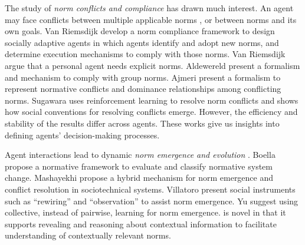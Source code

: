 The study of \emph{norm conflicts and compliance} has drawn much interest.
An agent may face conflicts between multiple applicable norms \citep{Ajmeri-IJCAI16-Coco}, or 
between norms and its own goals. 
Van Riemsdijk {\etal}  develop a norm compliance
framework to design socially adaptive agents in which agents 
identify and adopt new norms, and determine execution mechanisms to comply with those norms. 
Van Riemsdijk {\etal} argue that a personal agent needs explicit norms. 
Aldewereld {\etal}  present a formalism and mechanism to
comply with group norms. Ajmeri {\etal}  present a formalism to represent normative conflicts and dominance relationships among conflicting norms.  
Sugawara  uses
reinforcement learning to resolve norm conflicts and shows how social conventions
for resolving conflicts emerge. However, the efficiency and stability of the results
differ across agents. These works give us insights into defining agents'
decision-making processes.

Agent interactions lead to dynamic \emph{norm emergence and evolution} \citep{Savarimuthu2009NormEmergence}. 
Boella {\etal}  propose a normative framework to evaluate and classify normative system change. Mashayekhi {\etal}  propose a hybrid mechanism for norm emergence and conflict resolution in sociotechnical systems. Villatoro {\etal}  present social instruments
such as ``rewiring'' and ``observation'' to assist norm emergence. Yu {\etal}  suggest using collective, instead of pairwise, learning for norm emergence. 
%
\frameworkB is novel in that it supports revealing and reasoning 
about contextual information to facilitate understanding of contextually relevant norms. 

